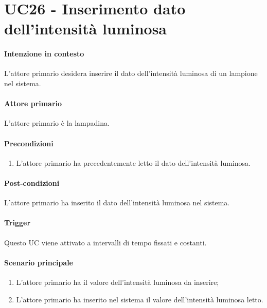 \section{UC26 - Inserimento dato dell'intensità luminosa}\label{uc:26}
\paragraph{Intenzione in contesto} L'attore primario desidera inserire il dato dell'intensità luminosa di un lampione nel sistema.
\paragraph{Attore primario} L'attore primario è la lampadina.
\paragraph{Precondizioni}  
\begin{enumerate}
    \item L'attore primario ha precedentemente letto il dato dell'intensità luminosa.
\end{enumerate}
\paragraph{Post-condizioni} L'attore primario ha inserito il dato dell'intensità luminosa nel sistema.
\paragraph{Trigger} Questo UC viene attivato a intervalli di tempo fissati e costanti.
\paragraph{Scenario principale}
\begin{enumerate}
    \item L'attore primario ha il valore dell'intensità luminosa da inserire;
    \item L'attore primario ha inserito nel sistema il valore dell'intensità luminosa letto.
\end{enumerate}
